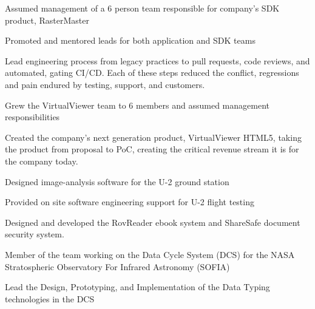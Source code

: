 \documentclass[letterpaper,10pt]{article}
\begin{document}
  \begin{resume_list}
    \item Assumed management of a 6 person team responsible for company's SDK product, RasterMaster
    \item Promoted and mentored leads for both application and SDK teams
    \item Lead engineering process from legacy practices to pull requests, code reviews, and automated, gating CI/CD.  Each of these steps reduced the conflict, regressions and pain endured by testing, support, and customers.
  \end{resume_list}

     
  \begin{resume_list}
    \item Grew the VirtualViewer team to 6 members and assumed management responsibilities 
  \end{resume_list}

  \begin{resume_list}
      \item Created the company's next generation product, VirtualViewer HTML5, taking the product from proposal to PoC, creating the critical revenue stream it is for the company today.
  \end{resume_list}

  \begin{resume_list}
    \item Designed image-analysis software for the U-2 ground station
    \item Provided on site software engineering support for U-2 flight testing
  \end{resume_list}
  
  \begin{resume_list}
      \item Designed and developed the RovReader ebook system and ShareSafe document security system.
  \end{resume_list}
  
  \begin{resume_list}
    \item Member of the team working on the Data Cycle System (DCS) for the NASA Stratospheric Observatory For Infrared Astronomy (SOFIA)
    \item Lead the Design, Prototyping, and Implementation of the Data Typing technologies in the DCS 
  \end{resume_list}
\end{document}
